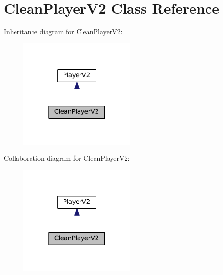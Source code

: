 \hypertarget{classCleanPlayerV2}{}\section{Clean\+Player\+V2 Class Reference}
\label{classCleanPlayerV2}


Inheritance diagram for Clean\+Player\+V2\+:\nopagebreak
\begin{figure}[H]
\begin{center}
\leavevmode
\includegraphics[width=166pt]{classCleanPlayerV2__inherit__graph}
\end{center}
\end{figure}


Collaboration diagram for Clean\+Player\+V2\+:\nopagebreak
\begin{figure}[H]
\begin{center}
\leavevmode
\includegraphics[width=166pt]{classCleanPlayerV2__coll__graph}
\end{center}
\end{figure}
